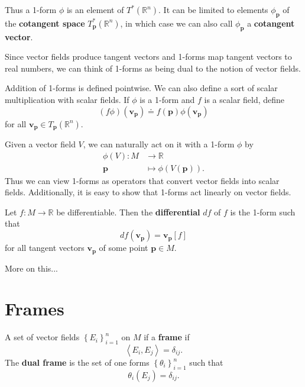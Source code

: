 \documentclass[twoside,10pt]{report}
\begin{document}
Thus a 1-form $\phi$ is an element of $T^*(\mathbb{R}^n)$. It can be limited to elements $\phi_\mathbf{p}$ of the \textbf{cotangent space} $T_{\mathbf{p}}^*(\mathbb{R}^n)$, in which case we can also call $\phi_\mathbf{p}$ a \textbf{cotangent vector}.

\begin{note}
Since vector fields produce tangent vectors and 1-forms map tangent vectors to real numbers, we can think of 1-forms as being dual to the notion of vector fields.
\end{note}

Addition of 1-forms is defined pointwise. We can also define a sort of scalar multiplication with scalar fields. If $\phi$ is a 1-form and $f$ is a scalar field, define
\[
	(f\phi)(\mathbf{v}_{\mathbf{p}}) \doteq f(\mathbf{p}) \phi(\mathbf{v}_\mathbf{p})
\] for all $\mathbf{v}_{\mathbf{p}} \in T_\mathbf{p}(\mathbb{R}^n)$.

Given a vector field $V$, we can naturally act on it with a 1-form $\phi$ by
\begin{align*}
	\phi(V):M&\to \mathbb{R} \\
	\mathbf{p}&\mapsto \phi(V(\mathbf{p})).
\end{align*}
Thus we can view 1-forms as operators that convert vector fields into scalar fields. Additionally, it is easy to show that 1-forms act linearly on vector fields.

\begin{defn}
Let $f:M\to \mathbb{R}$ be differentiable. Then the \textbf{differential} $df$ of $f$ is the 1-form such that
\[
	df(\mathbf{v}_{\mathbf{p}}) = \mathbf{v}_{\mathbf{p}}[f]
\] for all tangent vectors $\mathbf{v}_{\mathbf{p}}$ of some point $\mathbf{p} \in M$.
\end{defn}

{\color{red}More on this...}



\section{Frames}

\begin{defn}[]
A set of vector fields $\left\{ E_i \right\}_{i=1}^n$ on $M$ if a \textbf{frame} if
\[
\left\langle E_i, E_j \right\rangle = \delta_{ij}.
\] The \textbf{dual frame} is the set of one forms $\left\{ \theta_i \right\}_{i=1}^n$ such that
\[
	\theta_i(E_j) = \delta_{ij}.
\]
\end{defn}
\end{document}
